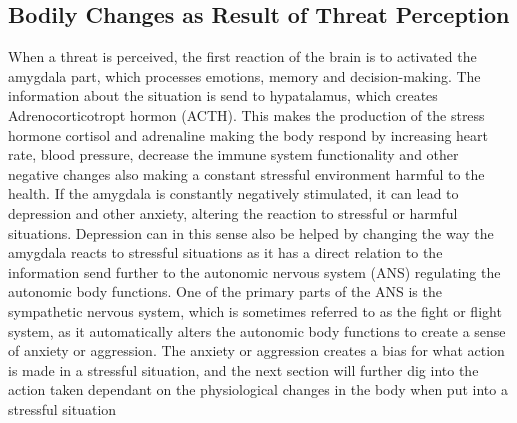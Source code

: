 \subsection{Bodily Changes as Result of Threat Perception}
When a threat is perceived, the first reaction of the brain is to activated the amygdala part, which processes emotions, memory and decision-making. The information about the situation is send to hypatalamus, which creates Adrenocorticotropt hormon (ACTH). This makes the production of the stress hormone cortisol and adrenaline making the body respond by increasing heart rate, blood pressure, decrease the immune system functionality and other negative changes also making a constant stressful environment harmful to the health. If the amygdala is constantly negatively stimulated, it can lead to depression and other anxiety, altering the reaction to stressful or harmful situations. Depression can in this sense also be helped by changing the way the amygdala reacts to stressful situations as it has a direct relation to the information send further to the autonomic nervous system (ANS) regulating the autonomic body functions. One of the primary parts of the ANS is the sympathetic nervous system, which is sometimes referred to as the fight or flight system, as it automatically alters the autonomic body functions to create a sense of anxiety or aggression. The anxiety or aggression creates a bias for what action is made in a stressful situation, and the next section will further dig into the action taken dependant on the physiological changes in the body when put into a stressful situation
